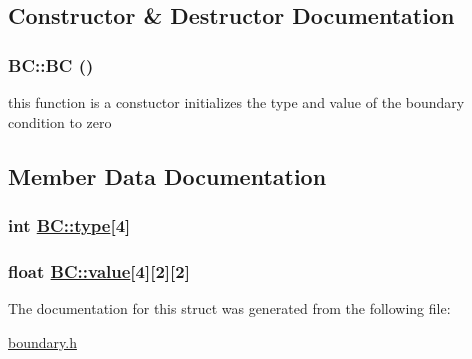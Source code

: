 \subsection{Constructor \& Destructor Documentation}
\hypertarget{structBC_a0}{
\subsubsection[BC]{\setlength{\rightskip}{0pt plus 5cm}BC::BC ()}}
\label{structBC_a0}


this function is a constuctor initializes the type and value of the boundary condition to zero 



\subsection{Member Data Documentation}
\hypertarget{structBC_o0}{
\subsubsection[type]{\setlength{\rightskip}{0pt plus 5cm}int \hyperlink{structBC_o0}{BC::type}\mbox{[}4\mbox{]}}}
\label{structBC_o0}


\hypertarget{structBC_o1}{
\subsubsection[value]{\setlength{\rightskip}{0pt plus 5cm}float \hyperlink{structBC_o1}{BC::value}\mbox{[}4\mbox{]}\mbox{[}2\mbox{]}\mbox{[}2\mbox{]}}}
\label{structBC_o1}




The documentation for this struct was generated from the following file:\begin{CompactItemize}
\item 
\hyperlink{boundary_8h}{boundary.h}\end{CompactItemize}
